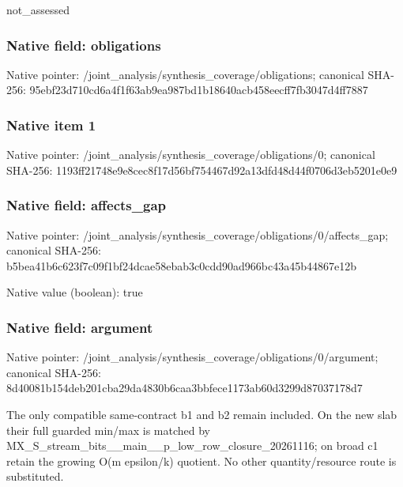 \documentclass[10pt,a4paper]{article}
\begin{document}
\begingroup\raggedright\sloppy not\_\allowbreak{}assessed\par\endgroup

\subsubsection{Native field: obligations}
Native pointer: /joint\_\allowbreak{}analysis/synthesis\_\allowbreak{}coverage/obligations; canonical SHA-256: 95ebf23d710cd6a4f1f63ab9ea987bd1b18640acb458eecff7fb3047d4ff7887

\subsubsection{Native item 1}
Native pointer: /joint\_\allowbreak{}analysis/synthesis\_\allowbreak{}coverage/obligations/0; canonical SHA-256: 1193ff21748e9e8cec8f17d56bf754467d92a13dfd48d44f0706d3eb5201e0e9

\subsubsection{Native field: affects\_\allowbreak{}gap}
Native pointer: /joint\_\allowbreak{}analysis/synthesis\_\allowbreak{}coverage/obligations/0/affects\_\allowbreak{}gap; canonical SHA-256: b5bea41b6c623f7c09f1bf24dcae58ebab3c0cdd90ad966bc43a45b44867e12b

Native value (boolean): true

\subsubsection{Native field: argument}
Native pointer: /joint\_\allowbreak{}analysis/synthesis\_\allowbreak{}coverage/obligations/0/argument; canonical SHA-256: 8d40081b154deb201cba29da4830b6caa3bbfece1173ab60d3299d87037178d7

\begingroup\raggedright\sloppy The only compatible same-contract b1 and b2 remain included. On the new slab their full guarded min/\allowbreak{}max is matched by MX\_\allowbreak{}S\_\allowbreak{}stream\_\allowbreak{}bits\_\allowbreak{}\_\allowbreak{}main\_\allowbreak{}\_\allowbreak{}p\_\allowbreak{}low\_\allowbreak{}row\_\allowbreak{}closure\_\allowbreak{}20261116;\allowbreak{} on broad c1 retain the growing O(m epsilon/\allowbreak{}k) quotient. No other quantity/\allowbreak{}resource route is substituted.\par\endgroup
\end{document}

